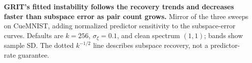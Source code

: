 \textbf{GRIT's fitted instability follows the recovery trends and decreases faster than subspace error as pair count grows.} Mirror of the three sweeps on CueMNIST, adding normalized predictor sensitivity to the subspace-error curves. Defaults are $k=256$, $\sigma_\xi=0.1$, and clean spectrum $(1,1)$; bands show sample SD. The dotted $k^{-1/2}$ line describes subspace recovery, not a predictor-rate guarantee.
